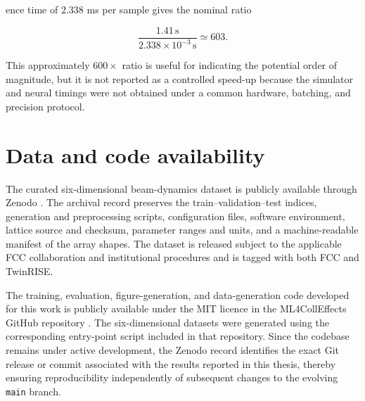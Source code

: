 ence time of \(2.338\) ms per sample gives the nominal ratio

\begin{equation}
\label{eq:54}
\frac{1.41\,\mathrm s}{2.338\times10^{-3}\,\mathrm s}\simeq603.
\end{equation}

This approximately \(600 \times\) ratio is useful for indicating the potential order of magnitude, but it is not reported as a controlled speed-up because the simulator and neural timings were not obtained under a common hardware, batching, and precision protocol.

\section{Data and code availability}
\label{sec:03_simulation_workflow_data_and_code_availability}

The curated six-dimensional beam-dynamics dataset is publicly available through Zenodo \cite{martinez2026dataset}. The archival record preserves the train–validation–test indices, generation and preprocessing scripts, configuration files, software environment, lattice source and checksum, parameter ranges and units, and a machine-readable manifest of the array shapes. The dataset is released subject to the applicable FCC collaboration and institutional procedures and is tagged with both FCC and TwinRISE.

The training, evaluation, figure-generation, and data-generation code developed for this work is publicly available under the MIT licence in the ML4CollEffects GitHub repository \cite{martinez2026code}. The six-dimensional datasets were generated using the corresponding entry-point script included in that repository. Since the codebase remains under active development, the Zenodo record identifies the exact Git release or commit associated with the results reported in this thesis, thereby ensuring reproducibility independently of subsequent changes to the evolving \texttt{main} branch.


